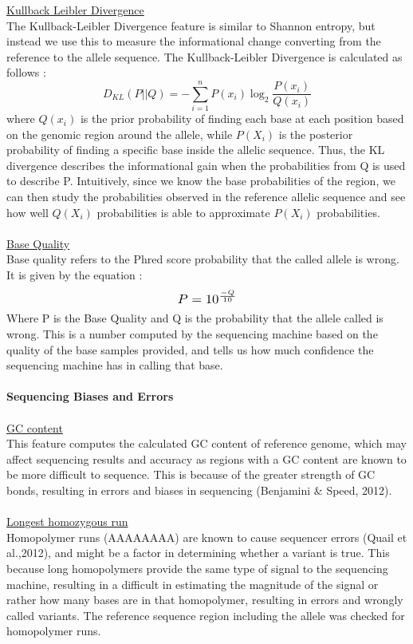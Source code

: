 \documentclass{article}
\begin{document}
\underline{Kullback Leibler Divergence}\\
The Kullback-Leibler Divergence feature is similar to Shannon entropy, but instead we use this to measure the informational change converting from the reference to the allele sequence. The Kullback-Leibler Divergence is calculated as follows :
\begin{equation}
D_{KL}(P||Q) = -\sum_{i=1}^{n}P(x_i)\log_{2}{\frac{P(x_i)}{Q(x_i)}}
\end{equation}
where $Q(x_i)$ is the prior probability of finding each base at each position based on the genomic region around the allele, while $P(X_i)$ is the posterior probability of finding a specific base inside the allelic sequence. Thus, the KL divergence describes the informational gain when the probabilities from Q is used to describe P. Intuitively, since we know the base probabilities of the region, we can then study the probabilities observed in the reference allelic sequence and see how well $Q(X_i)$ probabilities is able to approximate $P(X_i)$ probabilities.\\\\
\underline{Base Quality}\\
Base quality refers to the Phred score probability that the called allele is wrong. It is given by the equation :
\[ \scalebox{1.2}{$P=10^{\frac{-Q}{10}}$} \]
Where P is the Base Quality and Q is the probability that the allele called is wrong. This is a number computed by the sequencing machine based on the quality of the base samples provided, and tells us how much confidence the sequencing machine has in calling that base.\\\\
\textbf{Sequencing Biases and Errors} \\\\
\underline{GC content}\\
This feature computes the calculated GC content of reference genome, which may affect sequencing results and accuracy as regions with a GC content are known to be more difficult to sequence. This is because of the greater strength of GC bonds, resulting in errors and biases in sequencing (Benjamini \& Speed, 2012).\\\\ 
\underline{Longest homozygous run}\\
Homopolymer runs (AAAAAAAA) are known to cause sequencer errors (Quail et al.,2012), and might be a factor in determining whether a variant is true. This because long homopolymers provide the same type of signal to the sequencing machine, resulting in a difficult in estimating the magnitude of the signal or rather how many bases are in that homopolymer, resulting in errors and wrongly called variants. The reference sequence region including the allele was checked for homopolymer runs. \\\\
\end{document}
